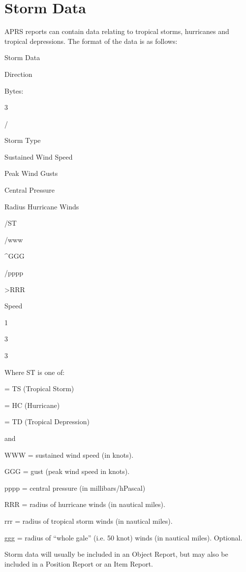 \section{Storm Data}

APRS reports can contain data relating to tropical storms, hurricanes and
tropical depressions. The format of the data is as follows:

Storm Data

Direction

Bytes:

3

/

Storm
Type

Sustained
Wind
Speed

Peak
Wind
Gusts

Central
Pressure

Radius
Hurricane
Winds

/ST

/www

^GGG

/pppp

>RRR

Speed

1

3

3



Where ST is one of:

\begin{description}
\item = TS (Tropical Storm)
\item = HC (Hurricane)
\item = TD (Tropical Depression)
\end{description}

and
\begin{description}
\item WWW = sustained wind speed (in knots).
\item GGG = gust (peak wind speed in knots).
\item pppp = central pressure (in millibars/hPascal)
\item RRR = radius of hurricane winds (in nautical miles).
\item rrr = radius of tropical storm winds (in nautical miles).
\item ggg = radius of “whole gale” (i.e. 50 knot) winds (in nautical
  miles). Optional.
\end {description}


Storm data will usually be included in an Object Report, but may also be
included in a Position Report or an Item Report.


